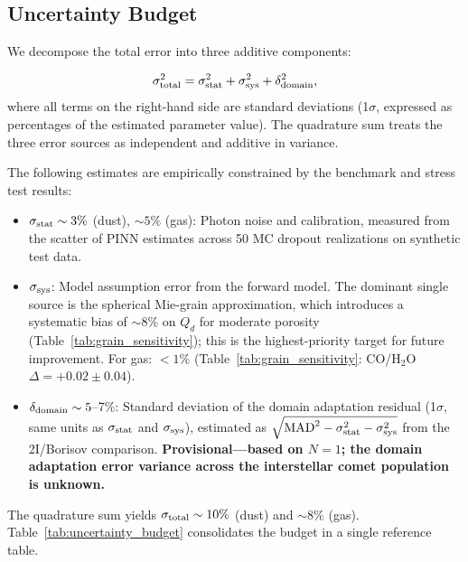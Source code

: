 \documentclass[usenatbib]{mnras}
\begin{document}
\subsection{Uncertainty Budget}\label{sec:uncertainty_budget}

We decompose the total error into three additive components:

\begin{equation}
\sigma_{\rm total}^2 = \sigma_{\rm stat}^2 + \sigma_{\rm sys}^2 + \delta_{\rm domain}^2,
\end{equation}
where all terms on the right-hand side are standard deviations (1$\sigma$, expressed as percentages of the estimated parameter value). The quadrature sum treats the three error sources as independent and additive in variance.

The following estimates are empirically constrained by the benchmark and stress test results:

\begin{itemize}
    \item $\sigma_{\rm stat} \sim 3\%$ (dust), $\sim 5\%$ (gas): Photon noise and calibration, measured from the scatter of PINN estimates across 50 MC dropout realizations on synthetic test data.
    \item $\sigma_{\rm sys}$: Model assumption error from the forward model. The dominant single source is the spherical Mie-grain approximation, which introduces a systematic bias of $\sim$8\% on $Q_d$ for moderate porosity (Table~\ref{tab:grain_sensitivity}); this is the highest-priority target for future improvement. For gas: $<1\%$ (Table~\ref{tab:grain_sensitivity}: CO/H$_2$O $\Delta = +0.02 \pm 0.04$).
    \item $\delta_{\rm domain} \sim 5$--7\%: Standard deviation of the domain adaptation residual (1$\sigma$, same units as $\sigma_{\rm stat}$ and $\sigma_{\rm sys}$), estimated as $\sqrt{\text{MAD}^2 - \sigma_{\rm stat}^2 - \sigma_{\rm sys}^2}$ from the 2I/Borisov comparison. \textbf{Provisional---based on $N=1$; the domain adaptation error variance across the interstellar comet population is unknown.}
\end{itemize}

The quadrature sum yields $\sigma_{\rm total} \sim 10\%$ (dust) and $\sim 8\%$ (gas). Table~\ref{tab:uncertainty_budget} consolidates the budget in a single reference table.
\end{document}
